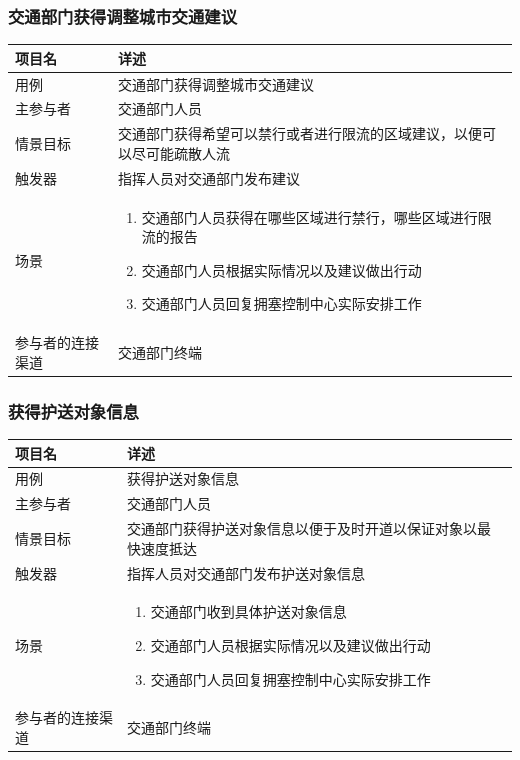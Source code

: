\documentclass{ctexrep}
\begin{document}
\subsubsection{交通部门获得调整城市交通建议}
\begin{longtable}{p{2cm} | p{10cm}}
\hline
项目名 & 详述 \\
\hline
\hline
用例 & 交通部门获得调整城市交通建议\\
\hline
主参与者 &交通部门人员 \\
\hline
情景目标 &  交通部门获得希望可以禁行或者进行限流的区域建议，以便可以尽可能疏散人流\\
\hline
触发器 &  指挥人员对交通部门发布建议\\
\hline
场景 & \begin{enumerate}
	\item 交通部门人员获得在哪些区域进行禁行，哪些区域进行限流的报告
	\item 交通部门人员根据实际情况以及建议做出行动
	\item 交通部门人员回复拥塞控制中心实际安排工作
\end{enumerate} \\
\hline
参与者的连接渠道 & 交通部门终端 \\
\hline
\end{longtable}

\subsubsection{获得护送对象信息}
\begin{longtable}{p{2cm} | p{10cm}}
\hline
项目名 & 详述 \\
\hline
\hline
用例 & 获得护送对象信息\\
\hline
主参与者 & 交通部门人员 \\
\hline
情景目标 &  交通部门获得护送对象信息以便于及时开道以保证对象以最快速度抵达\\
\hline
触发器 &  指挥人员对交通部门发布护送对象信息\\
\hline
场景 & \begin{enumerate}
	\item 交通部门收到具体护送对象信息
	\item 交通部门人员根据实际情况以及建议做出行动
	\item 交通部门人员回复拥塞控制中心实际安排工作
\end{enumerate} \\
\hline
参与者的连接渠道 & 交通部门终端 \\
\hline
\end{longtable}
\end{document}
